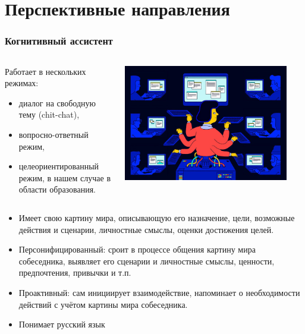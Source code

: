 \documentclass[default]{beamer}
\begin{document}
	\section{Перспективные направления}
	
	\begin{frame}
		\frametitle{Когнитивный ассистент}
		
		
			\begin{columns}
				\begin{column}{0.7\textwidth}
					Работает в нескольких режимах:
					\begin{itemize}
						\item диалог на свободную тему (chit-chat),
						\item вопросно-ответный режим,
						\item целеориентированный режим, в нашем случае в области образования.
					\end{itemize}
				\end{column}
				\begin{column}{0.3\textwidth}
					\includegraphics[width=0.9\textwidth]{assistant.jpg}
				\end{column}
			\end{columns}

		\begin{itemize}
			\item Имеет свою картину мира, описывающую его назначение, цели, возможные действия и сценарии, личностные смыслы, оценки достижения целей.
			\item Персонифицированный: сроит в процессе общения картину мира собеседника, выявляет его сценарии и личностные смыслы, ценности, предпочтения, привычки и т.п.
			\item Проактивный: сам инициирует взаимодействие, напоминает о необходимости действий с учётом картины мира собеседника.
			\item Понимает русский язык
		\end{itemize}
	\end{frame}
\end{document}

